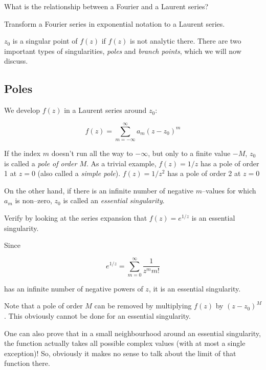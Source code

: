 \begin{exer}
  
  What is the relationship between a Fourier and a Laurent series?

  \begin{hnt}
  Transform a Fourier series in exponential notation to a Laurent series.
  \end{hnt}
    
\end{exer}



$z_0$ is a singular point of $f(z)$ if $f(z)$ is not analytic there. There are two important types of singularities, \emph{poles} and \emph{branch points}, which we will now discuss.

\subsection*{Poles}

We develop $f(z)$ in a Laurent series around $z_0$:

\begin{equation}
f(z)= \sum_{m=-\infty}^{\infty} a_m (z-z_0)^m
\end{equation} 

If the index $m$ doesn't run all the way to $-\infty$, but only to a finite value $-M$, $z_0$ is called a \emph{pole of order $M$}. As a trivial example, $f(z)=1/z$ has a pole of order 1 at $z=0$ (also called a \emph{simple pole}). $f(z)=1/z^2$ has a pole of order 2 at $z=0$

On the other hand, if there is an infinite number of negative $m$--values for which $a_m$ is non--zero, $z_0$ is called an \emph{essential singularity}.

\begin{cue}
  Verify by looking at the series expansion that $f(z)=e^{1/z}$ is an essential singularity.  
\end{cue}

Since

$$e^{1/z} = \sum_{m=0}^{\infty} \frac{1}{z^m m!} $$

has an infinite number of negative powers of $z$, it is an essential singularity.

Note that a pole of order $M$ can be removed by multiplying $f(z)$ by $(z-z_0)^M$. This obviously cannot be done for an essential singularity.

\noindent{}One can also prove that in a small neighbourhood around an essential singularity, the function actually takes all possible complex values (with at most a single exception)! So, obviously it makes no sense to talk about the limit of that function there.

